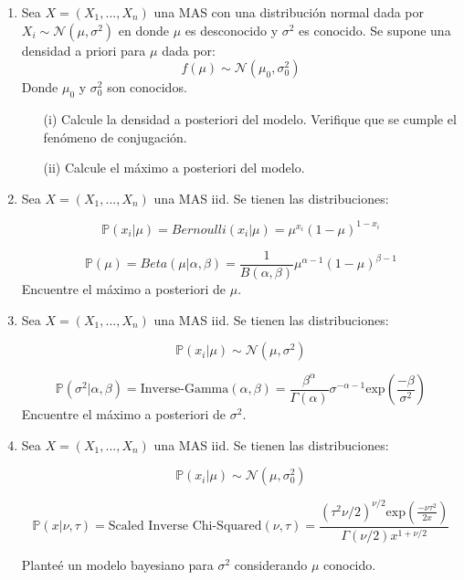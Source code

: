 \begin{enumerate}
\item Sea $X=(X_1,...,X_n)$ una MAS con una distribución normal dada por $X_i\sim\mathcal{N}(\mu,\sigma^2)$ en donde $\mu$ es desconocido y $\sigma^2$ es conocido. Se supone una densidad a priori para $\mu$ dada por:
\begin{equation}
    \nonumber 
    f(\mu)\sim \mathcal{N}(\mu_0,\sigma^2_0)
\end{equation}
Donde $\mu_0$ y $\sigma_0^2$ son conocidos.
\begin{itemize}
    \item[(i)] Calcule la densidad a posteriori del modelo. Verifique que se cumple el fenómeno de conjugación.
    \item[(ii)] Calcule el máximo a posteriori del modelo.
\end{itemize}

\item Sea $X=(X_1,...,X_n)$ una MAS iid. Se tienen las distribuciones:

\[\mathbb{P}(x_i|\mu)=Bernoulli(x_i|\mu)=\mu^{x_i}(1-\mu)^{1-x_i}
\]

\[\mathbb{P}(\mu)=Beta(\mu|\alpha,\beta)=\frac{1}{B(\alpha,\beta)}\mu^{\alpha-1}(1-\mu)^{\beta-1}\]
Encuentre el máximo a posteriori de $\mu$.


\item Sea $X=(X_1,...,X_n)$ una MAS iid. Se tienen las distribuciones:

\[\mathbb{P}(x_i|\mu)\sim \mathcal{N}(\mu,\sigma^2)
\]

\[\mathbb{P}(\sigma^2|\alpha,\beta)=\text{Inverse-Gamma}(\alpha,\beta)=\frac{\beta^\alpha}{\Gamma (\alpha)} \sigma^{-\alpha-1}\text{exp}\left ( \frac{-\beta}{\sigma^2} \right) \]
Encuentre el máximo a posteriori de $\sigma^2$.

\item Sea $X=(X_1,...,X_n)$ una MAS iid. Se tienen las distribuciones:

\[\mathbb{P}(x_i|\mu)\sim \mathcal{N}(\mu,\sigma^2_0)
\]

\[\mathbb{P}(x|\nu,\tau)=\text{Scaled Inverse Chi-Squared}(\nu,\tau)=\frac{(\tau^2\nu/2)^{\nu/2}\text{exp}\left(\frac{-\nu\tau^2}{2x} \right) }{\Gamma(\nu/2)x^{1+\nu/2}}    \]

Planteé un modelo bayesiano para $\sigma^2$ considerando $\mu$ conocido. 
\end{enumerate}

